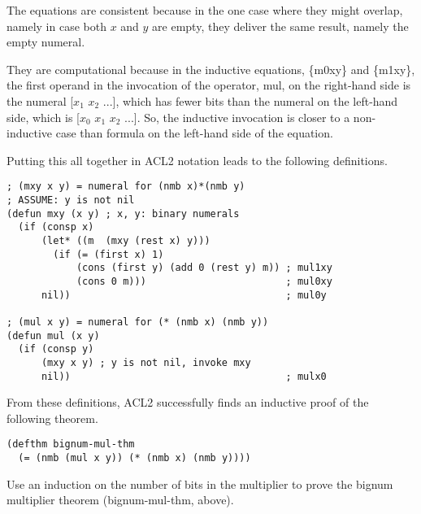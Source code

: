 The equations are consistent because in the one case
where they might overlap, namely in case both $x$ and $y$
are empty, they deliver the same result, namely the empty numeral.

They are computational because in the inductive equations,
\{m0xy\} and \{m1xy\}, the first operand in
the invocation of the operator, mul, on the right-hand side
is the numeral [$x_1$ $x_2$ ...], which has fewer bits
than the numeral on the left-hand side, which is
[$x_0$ $x_1$ $x_2$ ...].
So, the inductive invocation is closer to a non-inductive
case than formula on the left-hand side of the equation.

Putting this all together in ACL2 notation leads to the
following definitions.
\label{bignum-mul-defun}
\begin{verbatim}
; (mxy x y) = numeral for (nmb x)*(nmb y)
; ASSUME: y is not nil
(defun mxy (x y) ; x, y: binary numerals
  (if (consp x)
      (let* ((m  (mxy (rest x) y)))
        (if (= (first x) 1)
            (cons (first y) (add 0 (rest y) m)) ; mul1xy
            (cons 0 m)))                        ; mul0xy
      nil))                                     ; mul0y

; (mul x y) = numeral for (* (nmb x) (nmb y))
(defun mul (x y)
  (if (consp y)
      (mxy x y) ; y is not nil, invoke mxy
      nil))                                     ; mulx0
\end{verbatim}

From these definitions, ACL2 successfully finds an
inductive proof of the following theorem.
\label{bignum-mul-thm}
\begin{verbatim}
(defthm bignum-mul-thm
  (= (nmb (mul x y)) (* (nmb x) (nmb y))))
\end{verbatim}

\begin{ExerciseList}
\Exercise
Use an induction on the number of bits in the
multiplier to prove the bignum multiplier theorem (bignum-mul-thm, above).
\end{ExerciseList}


